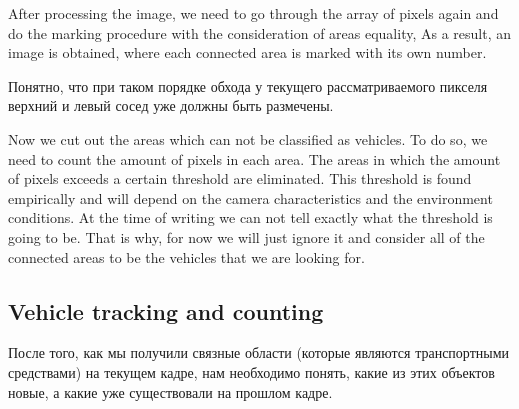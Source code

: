 \documentclass[12pt,a4paper,oneside,titlepage]{article}
\begin{document}
After processing the image, we need to go through the array of pixels again and do the marking procedure with the consideration of areas equality,
As a result, an image is obtained, where each connected area is marked with its own number.

Понятно, что при таком порядке обхода у текущего рассматриваемого пикселя верхний и левый сосед уже должны быть размечены.



Now we cut out the areas which can not be classified as vehicles.
To do so, we need to count the amount of pixels in each area. The areas in which the amount of pixels exceeds a certain threshold are eliminated.
This threshold is found empirically and will depend on the camera characteristics and the environment conditions.
At the time of writing we can not tell exactly what the threshold is going to be.
That is why, for now we will just ignore it and consider all of the connected areas to be the vehicles that we are looking for. 








\subsection{Vehicle tracking and counting}
После того, как мы получили связные области (которые являются транспортными средствами) на текущем кадре, нам необходимо понять, какие из этих объектов новые, а какие уже существовали на прошлом кадре.
\end{document}
